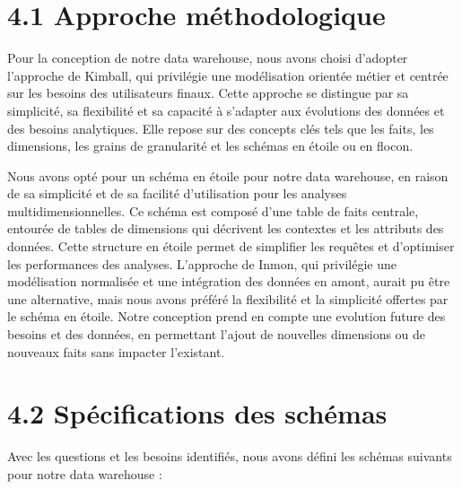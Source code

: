 \section*{4.1 Approche méthodologique}

Pour la conception de notre data warehouse, nous avons choisi d’adopter l'approche de Kimball, qui privilégie une modélisation orientée métier et centrée sur les besoins des utilisateurs finaux.
Cette approche se distingue par sa simplicité, sa flexibilité et sa capacité à s’adapter aux évolutions des données et des besoins analytiques.
Elle repose sur des concepts clés tels que les faits, les dimensions, les grains de granularité et les schémas en étoile ou en flocon.

Nous avons opté pour un schéma en étoile pour notre data warehouse, en raison de sa simplicité et de sa facilité d’utilisation pour les analyses multidimensionnelles.
Ce schéma est composé d’une table de faits centrale, entourée de tables de dimensions qui décrivent les contextes et les attributs des données.
Cette structure en étoile permet de simplifier les requêtes et d’optimiser les performances des analyses.
L'approche de Inmon, qui privilégie une modélisation normalisée et une intégration des données en amont, aurait pu être une alternative, mais nous avons préféré la flexibilité et la simplicité offertes par le schéma en étoile.
Notre conception prend en compte une evolution future des besoins et des données, en permettant l’ajout de nouvelles dimensions ou de nouveaux faits sans impacter l’existant.

\section*{4.2 Spécifications des schémas}

Avec les questions et les besoins identifiés, nous avons défini les schémas suivants pour notre data warehouse :

